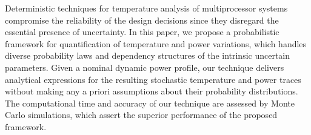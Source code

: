 Deterministic techniques for temperature analysis of multiprocessor systems compromise the reliability of the design decisions since they disregard the essential presence of uncertainty. In this paper, we propose a probabilistic framework for quantification of temperature and power variations, which handles diverse probability laws and dependency structures of the intrinsic uncertain parameters. Given a nominal dynamic power profile, our technique delivers analytical expressions for the resulting stochastic temperature and power traces without making any a priori assumptions about their probability distributions. The computational time and accuracy of our technique are assessed by Monte Carlo simulations, which assert the superior performance of the proposed framework.
